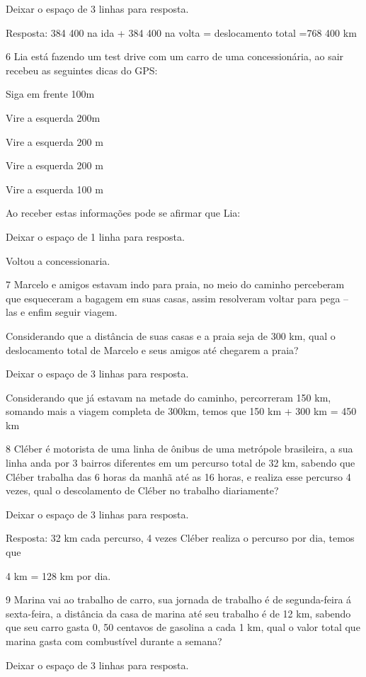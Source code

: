 Deixar o espaço de 3 linhas para resposta.

Resposta: 384 400 na ida + 384 400 na volta = deslocamento total =768
400 km

\num{6} Lia está fazendo um test drive com um carro de uma concessionária, ao
sair recebeu as seguintes dicas do GPS:

Siga em frente 100m

Vire a esquerda 200m

Vire a esquerda 200 m

Vire a esquerda 200 m

Vire a esquerda 100 m

Ao receber estas informações pode se afirmar que Lia:

Deixar o espaço de 1 linha para resposta.

Voltou a concessionaria.

\num{7} Marcelo e amigos estavam indo para praia, no meio do caminho
perceberam que esqueceram a bagagem em suas casas, assim resolveram
voltar para pega -- las e enfim seguir viagem.

Considerando que a distância de suas casas e a praia seja de 300 km,
qual o deslocamento total de Marcelo e seus amigos até chegarem a praia?

Deixar o espaço de 3 linhas para resposta.

Considerando que já estavam na metade do caminho, percorreram 150 km,
somando mais a viagem completa de 300km, temos que 150 km + 300 km = 450
km

\num{8} Cléber é motorista de uma linha de ônibus de uma metrópole
brasileira, a sua linha anda por 3 bairros diferentes em um percurso
total de 32 km, sabendo que Cléber trabalha das 6 horas da manhã até as
16 horas, e realiza esse percurso 4 vezes, qual o descolamento de Cléber
no trabalho diariamente?

Deixar o espaço de 3 linhas para resposta.

Resposta: 32 km cada percurso, 4 vezes Cléber realiza o percurso por
dia, temos que

4 km = 128 km por dia.

\num{9} Marina vai ao trabalho de carro, sua jornada de trabalho é de
segunda-feira á sexta-feira, a distância da casa de marina até seu
trabalho é de 12 km, sabendo que seu carro gasta 0, 50 centavos de
gasolina a cada 1 km, qual o valor total que marina gasta com
combustível durante a semana?

Deixar o espaço de 3 linhas para resposta.

